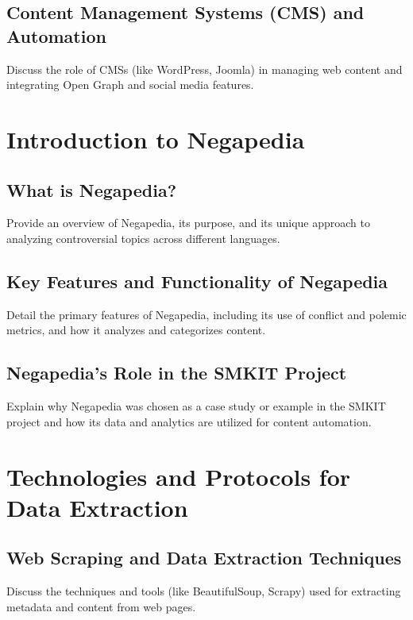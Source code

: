 \subsection{Content Management Systems (CMS) and Automation}
\label{subsec:content_management_systems_cms_and_automation}
Discuss the role of CMSs (like WordPress, Joomla) in managing web content and integrating Open Graph and social media features.

\section{Introduction to Negapedia}
\label{sec:introduction_to_negapedia}

\subsection{What is Negapedia?}
\label{subsec:what_is_negapedia}
Provide an overview of Negapedia, its purpose, and its unique approach to analyzing controversial topics across different languages.

\subsection{Key Features and Functionality of Negapedia}
\label{subsec:key_features_and_functionality_of_negapedia}
Detail the primary features of Negapedia, including its use of conflict and polemic metrics, and how it analyzes and categorizes content.

\subsection{Negapedia's Role in the SMKIT Project}
\label{subsec:negapedia_s_role_in_the_smkit_project}
Explain why Negapedia was chosen as a case study or example in the SMKIT project and how its data and analytics are utilized for content automation.

\section{Technologies and Protocols for Data Extraction}
\label{sec:technologies_and_protocols_for_data_extraction}

\subsection{Web Scraping and Data Extraction Techniques}
\label{subsec:web_scraping_and_data_extraction_techniques}
Discuss the techniques and tools (like BeautifulSoup, Scrapy) used for extracting metadata and content from web pages.

